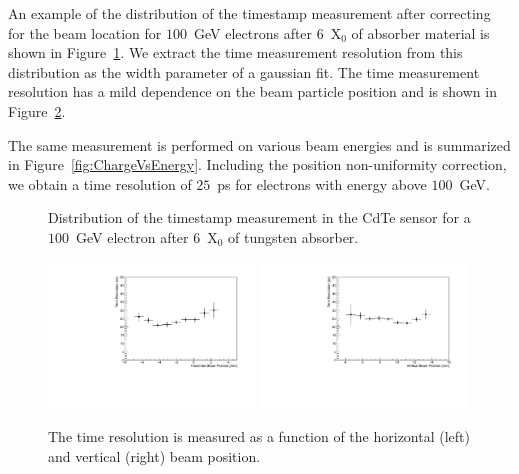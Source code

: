 An example of the distribution of the timestamp measurement after correcting for the
beam location for $100$~GeV electrons after $6$~$\mathrm{X}_{0}$ of absorber
material is shown in Figure~\ref{fig:DeltaT}. We extract the time measurement
resolution from this distribution as the width parameter of a gaussian fit.
The time measurement resolution has a mild dependence on the beam particle position
and is shown in Figure~\ref{fig:TimeResolutionVsBeamXY}.

The same measurement is performed on various beam energies and is summarized
in Figure~\ref{fig:ChargeVsEnergy}. Including the position non-uniformity 
correction, we obtain a time resolution of $25$~ps for electrons with energy above $100$~GeV. 

\begin{figure}[htbp] 
\centering
\caption{Distribution of the timestamp measurement in the CdTe sensor for a $100$~GeV
electron after $6$~$\mathrm{X}_{0}$ of tungsten absorber. } 
\label{fig:DeltaT} 
\end{figure} 


\begin{figure}[htbp] 
\centering
\includegraphics[width=0.49\textwidth]{figures/TimeResolutionVsBeamHorizontalPosition.pdf} 
\includegraphics[width=0.49\textwidth]{figures/TimeResolutionVsBeamVerticalPosition.pdf} 
\caption{ The time resolution is measured as a function of the horizontal (left) and vertical (right)
beam position. }
\label{fig:TimeResolutionVsBeamXY} 
\end{figure} 




